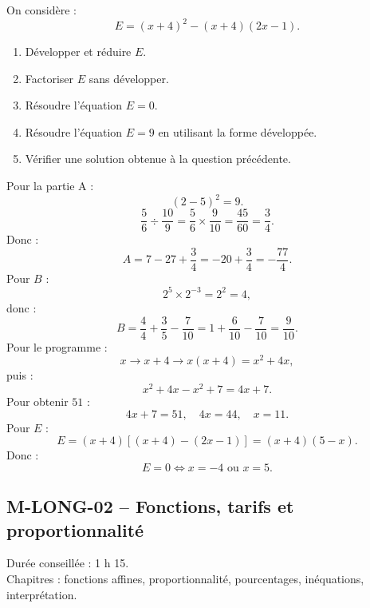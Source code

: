 \begin{exercice}
On considère :
\[
E=(x+4)^2-(x+4)(2x-1).
\]

\begin{enumerate}
  \item Développer et réduire $E$.
  \item Factoriser $E$ sans développer.
  \item Résoudre l'équation $E=0$.
  \item Résoudre l'équation $E=9$ en utilisant la forme développée.
  \item Vérifier une solution obtenue à la question précédente.
\end{enumerate}
\end{exercice}

\begin{correction}
Pour la partie A :
\[
(2-5)^2=9.
\]
\[
\frac{5}{6}\div\frac{10}{9}=\frac{5}{6}\times\frac{9}{10}=\frac{45}{60}=\frac34.
\]
Donc :
\[
A=7-27+\frac34=-20+\frac34=-\frac{77}{4}.
\]
Pour $B$ :
\[
2^5\times2^{-3}=2^2=4,
\]
donc :
\[
B=\frac44+\frac35-\frac7{10}=1+\frac6{10}-\frac7{10}=\frac9{10}.
\]
Pour le programme :
\[
x\rightarrow x+4\rightarrow x(x+4)=x^2+4x,
\]
puis :
\[
x^2+4x-x^2+7=4x+7.
\]
Pour obtenir $51$ :
\[
4x+7=51,\quad 4x=44,\quad x=11.
\]
Pour $E$ :
\[
E=(x+4)\left[(x+4)-(2x-1)\right]=(x+4)(5-x).
\]
Donc :
\[
E=0 \Longleftrightarrow x=-4 \text{ ou } x=5.
\]
\end{correction}

\newpage

\subsection{M-LONG-02 -- Fonctions, tarifs et proportionnalité}

\begin{objectif}
Durée conseillée : 1 h 15.\\
Chapitres : fonctions affines, proportionnalité, pourcentages, inéquations, interprétation.
\end{objectif}

